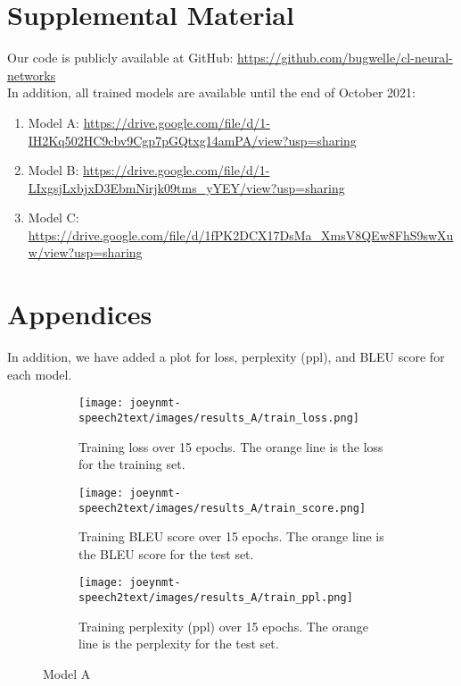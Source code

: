 \documentclass[11pt,a4paper]{article}
\begin{document}



\appendix

\section{Supplemental Material}
\label{sec:supplemental}

Our code is publicly available at GitHub: \url{https://github.com/bugwelle/cl-neural-networks}\\

In addition, all trained models are available until the end of October 2021:
\begin{enumerate}
    \item Model A: \newline \url{https://drive.google.com/file/d/1-IH2Kq502HC9cbv9Cgp7pGQtxg14amPA/view?usp=sharing}
    \item Model B: \newline \url{https://drive.google.com/file/d/1-LIxgsjLxbjxD3EbmNirjk09tms_yYEY/view?usp=sharing}
    \item Model C: \newline \url{https://drive.google.com/file/d/1fPK2DCX17DsMa_XmsV8QEw8FhS9swXuw/view?usp=sharing}
\end{enumerate}

\section{Appendices}

In addition, we have added a plot for loss, perplexity (ppl), and BLEU score for each model.

\begin{figure*}[ht]
    \begin{subfigure}[b]{0.32\textwidth}
        \centering
        \texttt{[image: joeynmt-speech2text/images/results\_A/train\_loss.png]}
        \caption{Training loss over 15 epochs. The orange line is the loss for the training set.}
        \label{fig:train_loss_a}
    \end{subfigure}
    \hfill
    \begin{subfigure}[b]{0.32\textwidth}
        \centering
        \texttt{[image: joeynmt-speech2text/images/results\_A/train\_score.png]}
        \caption{Training BLEU score over 15 epochs. The orange line is the BLEU score for the test set.}
        \label{fig:train_score_a}
    \end{subfigure}
    \hfill
    \begin{subfigure}[b]{0.32\textwidth}
        \centering
        \texttt{[image: joeynmt-speech2text/images/results\_A/train\_ppl.png]}
        \caption{Training perplexity (ppl) over 15 epochs. The orange line is the perplexity for the test set.}
        \label{fig:train_ppl_a}
    \end{subfigure}
    \caption{Model A}
    \label{fig:model_a_loss_ppl_score}
\end{figure*}
\end{document}
